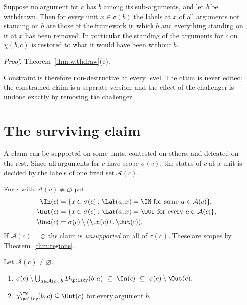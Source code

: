 \begin{theorem}[Reversibility]\label{thm:reversible}
Suppose no argument for $c$ has $b$ among its sub-arguments, and let $b$ be withdrawn. Then for every unit $x\in\sigma(b)$ the labels at $x$ of all arguments not standing on $b$ are those of the framework in which $b$ and everything standing on it at $x$ has been removed. In particular the standing of the arguments for $c$ on $\chi(b,c)$ is restored to what it would have been without $b$.
\end{theorem}

\begin{proof}
Theorem~\ref{thm:withdraw}(c).
\end{proof}

Constraint is therefore non-destructive at every level. The claim is never edited; the constrained claim is a separate version; and the effect of the challenger is undone exactly by removing the challenger.

\section{The surviving claim}\label{sec:survivor}

A claim can be supported on some units, contested on others, and defeated on the rest. Since all arguments for $c$ have scope $\sigma(c)$, the status of $c$ at a unit is decided by the labels of one fixed set $\mathcal A(c)$.

\begin{definition}\label{def:claimregions}
For $c$ with $\mathcal A(c)\ne\varnothing$ put
\begin{align*}
\In(c)&=\{x\in\sigma(c):\Lab(a,x)=\IN\text{ for some }a\in\mathcal A(c)\},\\
\Out(c)&=\{x\in\sigma(c):\Lab(a,x)=\OUT\text{ for every }a\in\mathcal A(c)\},\\
\Und(c)&=\sigma(c)\setminus(\In(c)\cup\Out(c)).
\end{align*}
If $\mathcal A(c)=\varnothing$ the claim is \emph{unsupported} on all of $\sigma(c)$. These are scopes by Theorem~\ref{thm:regions}.
\end{definition}

\begin{proposition}\label{prop:bounds}
Let $\mathcal A(c)\ne\varnothing$.
\begin{enumerate}[label=(\alph*)]
\item $\sigma(c)\setminus\bigcup_{a\in\mathcal A(c),\,b}D_\policy(b,a)\ \subseteq\ \In(c)\ \subseteq\ \sigma(c)\setminus\Out(c)$.
\item $\chi^{\IN}_\policy(b,c)\subseteq\Out(c)$ for every argument $b$.
\end{enumerate}
\end{proposition}

